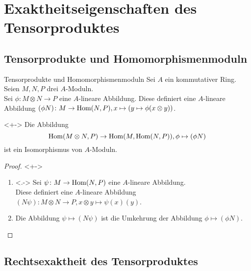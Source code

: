 \section{Exaktheitseigenschaften des Tensorproduktes}

\subsection{Tensorprodukte und Homomorphismenmoduln}

\begin{frame}{Tensorprodukte und Homomorphismenmoduln}
	Sei \(A\) ein kommutativer Ring. Seien \(M, N, P\) drei \(A\)-Moduln.
	\\
	Sei \(\phi\colon M \otimes N \to P\) eine \(A\)-lineare Abbildung. Diese
	definiert eine \(A\)-lineare Abbildung
	\((\phi N)\colon M \to \operatorname{Hom}(N, P), x \mapsto (y \mapsto \phi(x \otimes y))\).
	\begin{proposition}<+->
		Die Abbildung
		\[
			\operatorname{Hom}(M \otimes N, P) \to \operatorname{Hom}(M, \operatorname{Hom}(N, P)), \phi \mapsto (\phi N)
		\]
		ist ein Isomorphismus von \(A\)-Moduln.
	\end{proposition}
	\begin{proof}<+->
		\begin{enumerate}[<+->]
		\item<.->
			Sei \(\psi\colon M \to \operatorname{Hom}(N, P)\) eine \(A\)-lineare Abbildung.
			\\
			Diese definiert eine \(A\)-lineare Abbildung
			\((N\psi)\colon M \otimes N \to P, x \otimes y \mapsto \psi(x)(y)\).
		\item
			Die Abbildung \(\psi \mapsto (N\psi)\) ist die Umkehrung der
			Abbildung \(\phi \mapsto (\phi N)\).
		\qedhere
		\end{enumerate}
	\end{proof}
\end{frame}

\subsection{Rechtsexaktheit des Tensorproduktes}

